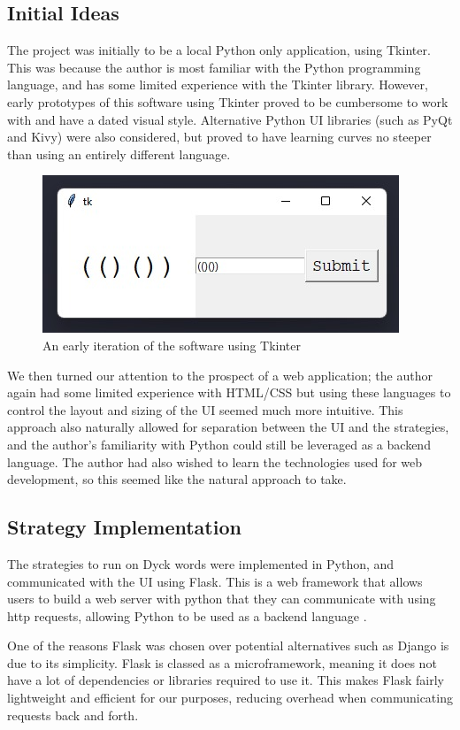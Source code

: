 \subsection{Initial Ideas}

The project was initially to be a local Python only application, using Tkinter. This was because the author is most familiar with the Python programming language, and has some limited experience with the Tkinter library. However, early prototypes of this software using Tkinter proved to be cumbersome to work with and have a dated visual style. Alternative Python UI libraries (such as PyQt and Kivy) were also considered, but proved to have learning curves no steeper than using an entirely different language.
\begin{figure}[H]
    \centering
    \includegraphics[scale = 0.7]{./images/tkinter-gui.jpeg}
    \caption{An early iteration of the software using Tkinter}
\end{figure}
\noindent We then turned our attention to the prospect of a web application; the author again had some limited experience with HTML/CSS but using these languages to control the layout and sizing of the UI seemed much more intuitive. This approach also naturally allowed for separation between the UI and the strategies, and the author's familiarity with Python could still be leveraged as a backend language. The author had also wished to learn the technologies used for web development, so this seemed like the natural approach to take.

\subsection{Strategy Implementation}
The strategies to run on Dyck words were implemented in Python, and communicated with the UI using Flask. This is a web framework that allows users to build a web server with python that they can communicate with using http requests, allowing Python to be used as a backend language \cite{whatisFlask}. 

\par\null\par
\noindent One of the reasons Flask was chosen over potential alternatives such as Django is due to its simplicity. Flask is classed as a microframework, meaning it does not have a lot of dependencies or libraries required to use it. This makes Flask fairly lightweight and efficient for our purposes, reducing overhead when communicating requests back and forth. 

